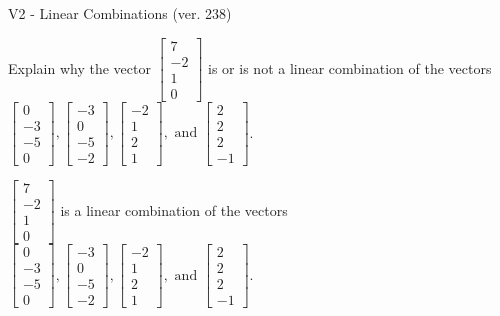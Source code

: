 \begin{exercise}
  \begin{exerciseTitle}V2 - Linear Combinations (ver. 238)\end{exerciseTitle}
  \begin{exerciseStatement}
    Explain why the vector \(\left[\begin{array}{c}
7 \\
-2 \\
1 \\
0
\end{array}\right]\)  is or is not a linear 
	combination of the vectors \(\left[\begin{array}{c}
0 \\
-3 \\
-5 \\
0
\end{array}\right] , \left[\begin{array}{c}
-3 \\
0 \\
-5 \\
-2
\end{array}\right] , \left[\begin{array}{c}
-2 \\
1 \\
2 \\
1
\end{array}\right] , \text{ and } \left[\begin{array}{c}
2 \\
2 \\
2 \\
-1
\end{array}\right]\).
	


  \end{exerciseStatement}
  \begin{exerciseAnswer}
   \(\left[\begin{array}{c}
7 \\
-2 \\
1 \\
0
\end{array}\right]\) 
  	 is  
	a linear combination of the vectors \(\left[\begin{array}{c}
0 \\
-3 \\
-5 \\
0
\end{array}\right] , \left[\begin{array}{c}
-3 \\
0 \\
-5 \\
-2
\end{array}\right] , \left[\begin{array}{c}
-2 \\
1 \\
2 \\
1
\end{array}\right] , \text{ and } \left[\begin{array}{c}
2 \\
2 \\
2 \\
-1
\end{array}\right]\).


\end{exerciseAnswer}
\end{exercise}
